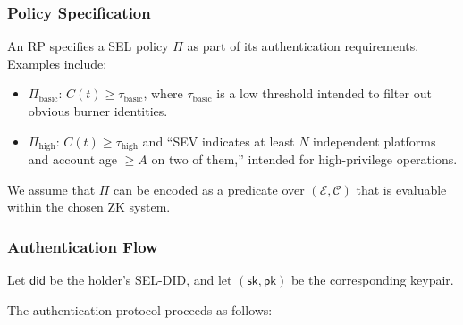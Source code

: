 \documentclass[11pt]{article}
\begin{document}
\subsubsection{Policy Specification}

An RP specifies a SEL policy $\Pi$ as part of its authentication requirements. Examples include:

\begin{itemize}
  \item $\Pi_{\text{basic}}$: $C(t) \geq \tau_{\text{basic}}$, where $\tau_{\text{basic}}$ is a low threshold intended to filter out obvious burner identities.
  \item $\Pi_{\text{high}}$: $C(t) \geq \tau_{\text{high}}$ and ``SEV indicates at least $N$ independent platforms and account age $\geq A$ on two of them,'' intended for high-privilege operations.
\end{itemize}

We assume that $\Pi$ can be encoded as a predicate over $(\mathcal{E}, \mathcal{C})$ that is evaluable within the chosen ZK system.

\subsubsection{Authentication Flow}

Let $\mathsf{did}$ be the holder's SEL-DID, and let $(\mathsf{sk}, \mathsf{pk})$ be the corresponding keypair.

The authentication protocol proceeds as follows:
\end{document}
